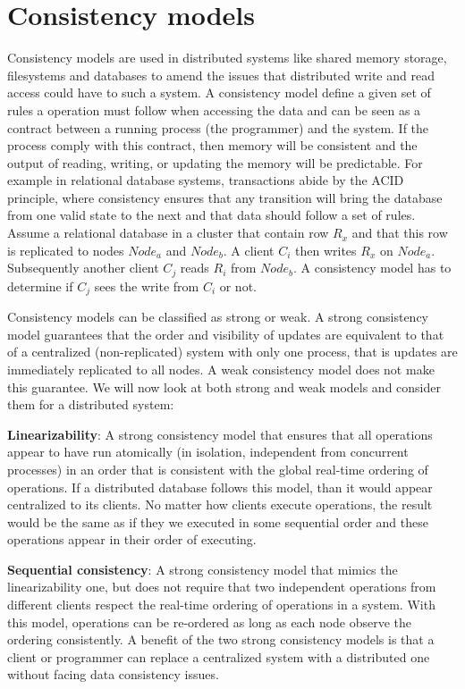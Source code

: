 \newpage
\section{Consistency models}

Consistency models are used in distributed systems like shared memory storage, filesystems and databases to amend the issues that distributed write and read access could have to such a system. A consistency model define a given set of rules a operation must follow when accessing the data and can be seen as a contract between a running process (the programmer) and the system. If the process comply with this contract, then memory will be consistent and the output of reading, writing, or updating the memory will be predictable. For example in relational database systems, transactions abide by the ACID principle, where consistency ensures that any transition will bring the database from one valid state to the next and that data should follow a set of rules. Assume a relational database in a cluster that contain row $R_x$ and that this row is replicated to nodes $Node_a$ and $Node_b$. A client $C_i$ then writes $R_x$ on $Node_a$. Subsequently another client $C_j$ reads $R_i$ from $Node_b$. A consistency model has to determine if $C_j$ sees the write from $C_i$ or not.

\noindent Consistency models can be classified as strong or weak. A strong consistency model guarantees that the order and visibility of updates are equivalent to that of a centralized (non-replicated) system with only one process, that is updates are immediately replicated to all nodes. A weak consistency model does not make this guarantee. We will now look at both strong and weak models and consider them for a distributed system:

\noindent \textbf{Linearizability}: A strong consistency model that ensures that all operations appear to have run atomically (in isolation, independent from concurrent processes) in an order that is consistent with the global real-time ordering of operations. If a distributed database follows this model, than it would appear centralized to its clients. No matter how clients execute operations, the result would be the same as if they we executed in some sequential order and these operations appear in their order of executing.

\noindent \textbf{Sequential consistency}: A strong consistency model that mimics the linearizability one, but does not require that two independent operations from different clients respect the real-time ordering of operations in a system. With this model, operations can be re-ordered as long as each node observe the ordering consistently. A benefit of the two strong consistency models is that a client or programmer can replace a centralized system with a distributed one without facing data consistency issues.

